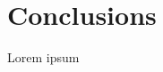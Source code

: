 \documentclass[../main.tex]{subfiles}
\begin{document}
\chapter{Conclusions}

Lorem ipsum
\end{document}
